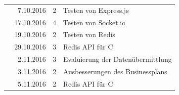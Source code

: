 \documentclass[12pt]{article}
\begin{document}
\begin{table}[hp]
\begin{tabular}{|l|r|c|l|}
                                                                                                             & 7.10.2016                           & 2                                         & Testen von Express.js                                                                                                                                         \\ \cline{2-4}
                                                                                                             & 17.10.2016                          & 4                                         & Testen von Socket.io                                                                                                                                          \\ \cline{2-4}
                                                                                                             & 19.10.2016                          & 2                                         & Testen von Redis                                                                                                                                              \\ \cline{2-4}
                                                                                                             & 29.10.2016                          & 3                                         & Redis API für C                                                                                                                                               \\ \cline{2-4}
                                                                                                             & 2.11.2016                           & 3                                         & Evaluierung der Datenübermittlung                                                                                                                             \\ \cline{2-4}
                                                                                                             & 3.11.2016                           & 2                                         & Ausbesserungen des Businessplans                                                                                                                              \\ \cline{2-4}
                                                                                                             & 5.11.2016                           & 2                                         & Redis API für C                                                                                                                                               \\ \cline{2-4}

\end{tabular}
\end{table}
\end{document}
